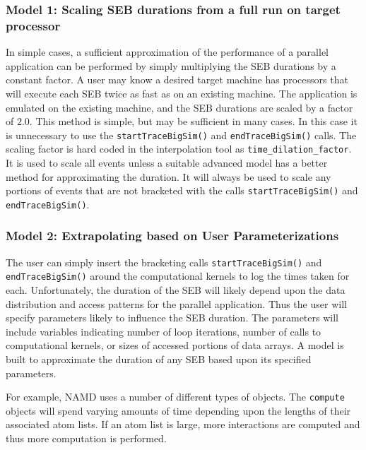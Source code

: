 \subsubsection{Model 1: Scaling SEB durations from a full run on target processor\label{sec:model:scale}}

In simple cases, a sufficient approximation of the performance of a parallel application can be performed by simply multiplying the SEB durations by a constant factor.  A user may know a desired target machine has processors that will execute each SEB twice as fast as on an existing machine. The application is emulated on the existing machine, and the SEB durations are scaled by a factor of $2.0$. This method is simple, but may be sufficient in many cases. In this case it is unnecessary to use the \texttt{startTraceBigSim()} and  \texttt{endTraceBigSim()} calls. The scaling factor is hard coded in the interpolation tool as \texttt{time\_dilation\_factor}. It is used to scale all events unless a suitable advanced model has a better method for approximating the duration. It will always be used to scale any portions of events that are not bracketed with the calls \texttt{startTraceBigSim()} and  \texttt{endTraceBigSim()}.

\subsubsection{Model 2: Extrapolating based on User Parameterizations\label{sec:model:parameterization}}

The user can simply insert the bracketing calls  \texttt{startTraceBigSim()} and  \texttt{endTraceBigSim()} around the computational kernels to log the times taken for each. Unfortunately, the duration of the SEB will likely depend upon the data distribution and access patterns for the parallel application. Thus the user will specify parameters likely to influence the SEB duration. The parameters will include variables indicating number of loop iterations, number of calls to computational kernels, or sizes of accessed portions of data arrays. A model is built to approximate the duration of any SEB based upon its specified parameters.

For example, NAMD uses a number of different types of objects. The \texttt{compute} objects will spend varying amounts of time depending upon the lengths of their associated atom lists. If an atom list is large, more interactions are computed and thus more computation is performed. 

